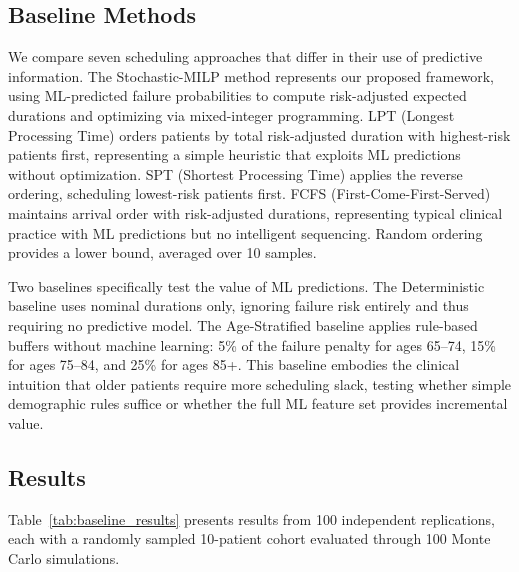 \documentclass[11pt,a4paper]{article}
\begin{document}
\subsection{Baseline Methods}
\label{sec:baselines}

We compare seven scheduling approaches that differ in their use of predictive information. The Stochastic-MILP method represents our proposed framework, using ML-predicted failure probabilities to compute risk-adjusted expected durations and optimizing via mixed-integer programming. LPT (Longest Processing Time) orders patients by total risk-adjusted duration with highest-risk patients first, representing a simple heuristic that exploits ML predictions without optimization. SPT (Shortest Processing Time) applies the reverse ordering, scheduling lowest-risk patients first. FCFS (First-Come-First-Served) maintains arrival order with risk-adjusted durations, representing typical clinical practice with ML predictions but no intelligent sequencing. Random ordering provides a lower bound, averaged over 10 samples.

Two baselines specifically test the value of ML predictions. The Deterministic baseline uses nominal durations only, ignoring failure risk entirely and thus requiring no predictive model. The Age-Stratified baseline applies rule-based buffers without machine learning: 5\% of the failure penalty for ages 65--74, 15\% for ages 75--84, and 25\% for ages 85+. This baseline embodies the clinical intuition that older patients require more scheduling slack, testing whether simple demographic rules suffice or whether the full ML feature set provides incremental value.

\subsection{Results}
\label{sec:results}

Table~\ref{tab:baseline_results} presents results from 100 independent replications, each with a randomly sampled 10-patient cohort evaluated through 100 Monte Carlo simulations.
\end{document}

